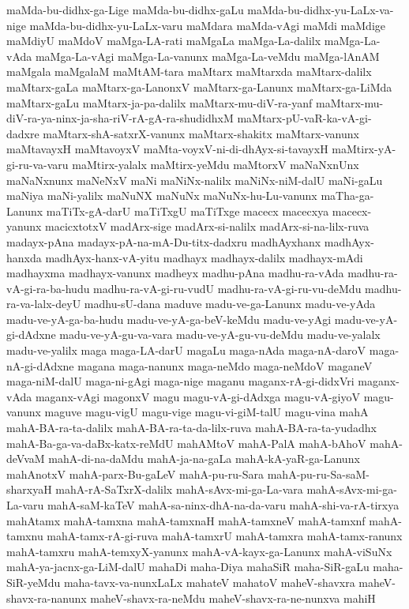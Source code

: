 {maMda-bu-didhx-ga-Lige
maMda-bu-didhx-gaLu
maMda-bu-didhx-yu-LaLx-va-nige
maMda-bu-didhx-yu-LaLx-varu
maMdara
maMda-vAgi
maMdi
maMdige
maMdiyU
maMdoV
maMga-LA-rati
maMgaLa
maMga-La-dalilx
maMga-La-vAda
maMga-La-vAgi
maMga-La-vanunx
maMga-La-veMdu
maMga-lAnAM
maMgala
maMgalaM
maMtAM-tara
maMtarx
maMtarxda
maMtarx-dalilx
maMtarx-gaLa
maMtarx-ga-LanonxV
maMtarx-ga-Lanunx
maMtarx-ga-LiMda
maMtarx-gaLu
maMtarx-ja-pa-dalilx
maMtarx-mu-diV-ra-yanf
maMtarx-mu-diV-ra-ya-ninx-ja-sha-riV-rA-gA-ra-shudidhxM
maMtarx-pU-vaR-ka-vA-gi-dadxre
maMtarx-shA-satxrX-vanunx
maMtarx-shakitx
maMtarx-vanunx
maMtavayxH
maMtavoyxV
maMta-voyxV-ni-di-dhAyx-si-tavayxH
maMtirx-yA-gi-ru-va-varu
maMtirx-yalalx
maMtirx-yeMdu
maMtorxV
maNaNxnUnx
maNaNxnunx
maNeNxV
maNi
maNiNx-nalilx
maNiNx-niM-dalU
maNi-gaLu
maNiya
maNi-yalilx
maNuNX
maNuNx
maNuNx-hu-Lu-vanunx
maTha-ga-Lanunx
maTiTx-gA-darU
maTiTxgU
maTiTxge
macecx
macecxya
macecx-yanunx
macicxtotxV
madArx-sige
madArx-si-nalilx
madArx-si-na-lilx-ruva
madayx-pAna
madayx-pA-na-mA-Du-titx-dadxru
madhAyxhanx
madhAyx-hanxda
madhAyx-hanx-vA-yitu
madhayx
madhayx-dalilx
madhayx-mAdi
madhayxma
madhayx-vanunx
madheyx
madhu-pAna
madhu-ra-vAda
madhu-ra-vA-gi-ra-ba-hudu
madhu-ra-vA-gi-ru-vudU
madhu-ra-vA-gi-ru-vu-deMdu
madhu-ra-va-lalx-deyU
madhu-sU-dana
maduve
madu-ve-ga-Lanunx
madu-ve-yAda
madu-ve-yA-ga-ba-hudu
madu-ve-yA-ga-beV-keMdu
madu-ve-yAgi
madu-ve-yA-gi-dAdxne
madu-ve-yA-gu-va-vara
madu-ve-yA-gu-vu-deMdu
madu-ve-yalalx
madu-ve-yalilx
maga
maga-LA-darU
magaLu
maga-nAda
maga-nA-daroV
maga-nA-gi-dAdxne
magana
maga-nanunx
maga-neMdo
maga-neMdoV
maganeV
maga-niM-dalU
maga-ni-gAgi
maga-nige
maganu
maganx-rA-gi-didxVri
maganx-vAda
maganx-vAgi
magonxV
magu
magu-vA-gi-dAdxga
magu-vA-giyoV
magu-vanunx
maguve
magu-vigU
magu-vige
magu-vi-giM-talU
magu-vina
mahA
mahA-BA-ra-ta-dalilx
mahA-BA-ra-ta-da-lilx-ruva
mahA-BA-ra-ta-yudadhx
mahA-Ba-ga-va-daBx-katx-reMdU
mahAMtoV
mahA-PalA
mahA-bAhoV
mahA-deVvaM
mahA-di-na-daMdu
mahA-ja-na-gaLa
mahA-kA-yaR-ga-Lanunx
mahAnotxV
mahA-parx-Bu-gaLeV
mahA-pu-ru-Sara
mahA-pu-ru-Sa-saM-sharxyaH
mahA-rA-SaTxrX-dalilx
mahA-sAvx-mi-ga-La-vara
mahA-sAvx-mi-ga-La-varu
mahA-saM-kaTeV
mahA-sa-ninx-dhA-na-da-varu
mahA-shi-va-rA-tirxya
mahAtamx
mahA-tamxna
mahA-tamxnaH
mahA-tamxneV
mahA-tamxnf
mahA-tamxnu
mahA-tamx-rA-gi-ruva
mahA-tamxrU
mahA-tamxra
mahA-tamx-ranunx
mahA-tamxru
mahA-temxyX-yanunx
mahA-vA-kayx-ga-Lanunx
mahA-viSuNx
mahA-ya-jacnx-ga-LiM-dalU
mahaDi
maha-Diya
mahaSiR
maha-SiR-gaLu
maha-SiR-yeMdu
maha-tavx-va-nunxLaLx
mahateV
mahatoV
maheV-shavxra
maheV-shavx-ra-nanunx
maheV-shavx-ra-neMdu
maheV-shavx-ra-ne-nunxva
mahiH
}
